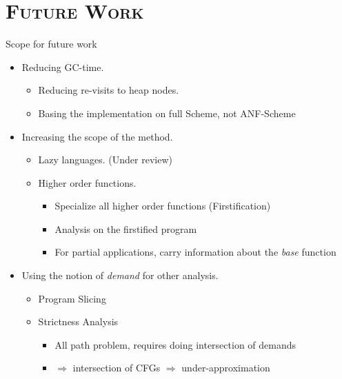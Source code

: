 \documentclass[xcolor=x11names,compress,mathserif]{beamer}
\renewcommand{\(}{\begin{columns}}
\renewcommand{\)}{\end{columns}}
\newcommand{\<}[1]{\begin{column}{#1}}
\renewcommand{\>}{\end{column}}
\begin{document}
\section{\scshape Future Work}
\begin{frame}{Scope for future work}
\normalsize
\begin{itemize}\itemsep2em
\item<1-> Reducing GC-time.
  \begin{itemize}
  \item Reducing re-visits to heap nodes.
  \item Basing the implementation on full Scheme, not ANF-Scheme
  \end{itemize}
\item<2-> Increasing the scope of the method.
  \begin{itemize}
  \item Lazy languages. (Under review)
  \item Higher order functions.
    \begin{itemize}
    \item Specialize all higher order functions (Firstification)
    \item Analysis on the firstified program 
    \item For partial applications, carry information about the {\em base} function
\end{itemize}
  \end{itemize}
\item<3-> Using the notion of {\em demand} for other analysis.
  \begin{itemize}
  \item Program Slicing
  \item Strictness Analysis
    \begin{itemize}
    \item All path problem, requires doing intersection of demands 
    \item $\Rightarrow$ intersection of CFGs $\Rightarrow$ under-approximation
    \end{itemize}
  \end{itemize}
\end{itemize}
\end{frame}
\end{document}
